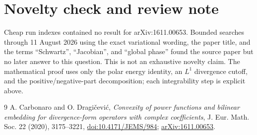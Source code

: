 \documentclass[10pt]{article}
\begin{document}
\section{Novelty check and review note}

Cheap run indexes contained no result for arXiv:1611.00653.  Bounded searches
through 11 August 2026 using the exact variational wording, the paper title,
and the terms ``Schwartz'', ``Jacobian'', and ``global phase'' found the
source paper but no later answer to this question.  This is not an exhaustive
novelty claim.  The mathematical proof uses only the polar energy identity,
an $L^1$ divergence cutoff, and the positive/negative-part decomposition;
each integrability step is explicit above.

\begin{thebibliography}{9}
A. Carbonaro and O. Dragi\v cevi\'c,
\emph{Convexity of power functions and bilinear embedding for
divergence-form operators with complex coefficients},
J. Eur. Math. Soc. 22 (2020), 3175--3221,
\href{https://doi.org/10.4171/JEMS/984}{doi:10.4171/JEMS/984};
\href{https://arxiv.org/abs/1611.00653}{arXiv:1611.00653}.
\end{thebibliography}
\end{document}
